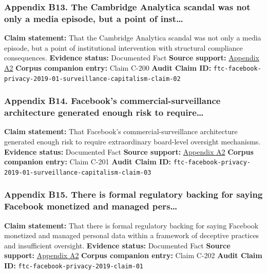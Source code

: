 \documentclass[
  american,
  11pt,
  letterpaper,
]{article}
\begin{document}
\subsubsection{Appendix B13. The Cambridge Analytica scandal was not
only a media episode, but a point of
inst\ldots{}}\label{ch-01-appendix-b13-the-cambridge-analytica-scandal-was-not-only-a-media-episode-but-a-point-of-inst}

\textbf{Claim statement:} That the Cambridge Analytica scandal was not
only a media episode, but a point of institutional intervention with
structural compliance consequences. \textbf{Evidence status:} Documented
Fact \textbf{Source support:}
\hyperref[ch-01-appendix-a2-ftc-imposes-5-billion-penalty-and-sweeping-new-privacy-restrictions-on-facebook]{Appendix
A2} \textbf{Corpus companion entry:} Claim C-200 \textbf{Audit Claim
ID:}
\texttt{ftc-facebook-privacy-2019-01-surveillance-capitalism-claim-02}

\subsubsection{Appendix B14. Facebook's commercial-surveillance
architecture generated enough risk to
require\ldots{}}\label{ch-01-appendix-b14-facebooks-commercial-surveillance-architecture-generated-enough-risk-to-require}

\textbf{Claim statement:} That Facebook's commercial-surveillance
architecture generated enough risk to require extraordinary board-level
oversight mechanisms. \textbf{Evidence status:} Documented Fact
\textbf{Source support:}
\hyperref[ch-01-appendix-a2-ftc-imposes-5-billion-penalty-and-sweeping-new-privacy-restrictions-on-facebook]{Appendix
A2} \textbf{Corpus companion entry:} Claim C-201 \textbf{Audit Claim
ID:}
\texttt{ftc-facebook-privacy-2019-01-surveillance-capitalism-claim-03}

\subsubsection{Appendix B15. There is formal regulatory backing for
saying Facebook monetized and managed
pers\ldots{}}\label{ch-01-appendix-b15-there-is-formal-regulatory-backing-for-saying-facebook-monetized-and-managed-pers}

\textbf{Claim statement:} That there is formal regulatory backing for
saying Facebook monetized and managed personal data within a framework
of deceptive practices and insufficient oversight. \textbf{Evidence
status:} Documented Fact \textbf{Source support:}
\hyperref[ch-01-appendix-a2-ftc-imposes-5-billion-penalty-and-sweeping-new-privacy-restrictions-on-facebook]{Appendix
A2} \textbf{Corpus companion entry:} Claim C-202 \textbf{Audit Claim
ID:} \texttt{ftc-facebook-privacy-2019-claim-01}
\end{document}
